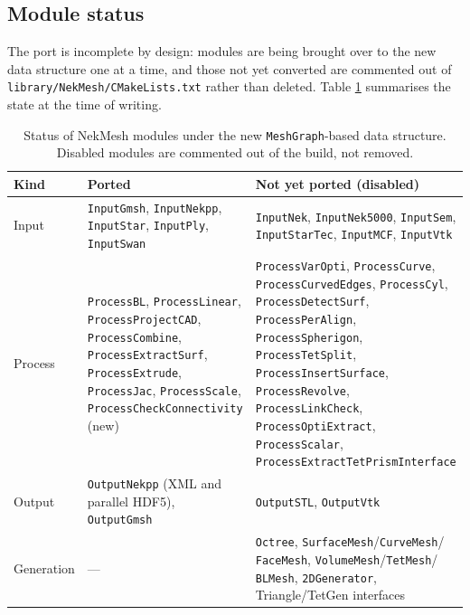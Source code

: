 \subsection{Module status}
The port is incomplete by design: modules are being brought over to
the new data structure one at a time, and those not yet converted are
commented out of \texttt{library/NekMesh/CMakeLists.txt} rather than
deleted. Table \ref{tab:module_status} summarises the state at the
time of writing.

\begin{table}[h!]
  \centering
  \begin{tabular}{p{}p{}p{}}
    \hline
    \textbf{Kind} & \textbf{Ported} & \textbf{Not yet ported (disabled)}\\
    \hline
    Input &
    \texttt{InputGmsh}, \texttt{InputNekpp}, \texttt{InputStar},
    \texttt{InputPly}, \texttt{InputSwan} &
    \texttt{InputNek}, \texttt{InputNek5000}, \texttt{InputSem},
    \texttt{InputStarTec}, \texttt{InputMCF}, \texttt{InputVtk}\\
    \hline
    Process &
    \texttt{ProcessBL}, \texttt{ProcessLinear},
    \texttt{ProcessProjectCAD}, \texttt{ProcessCombine},
    \texttt{ProcessExtractSurf}, \texttt{ProcessExtrude},
    \texttt{ProcessJac}, \texttt{ProcessScale},
    \texttt{ProcessCheckConnectivity} (new) &
    \texttt{ProcessVarOpti}, \texttt{ProcessCurve},
    \texttt{ProcessCurvedEdges}, \texttt{ProcessCyl},
    \texttt{ProcessDetectSurf}, \texttt{ProcessPerAlign},
    \texttt{ProcessSpherigon}, \texttt{ProcessTetSplit},
    \texttt{ProcessInsertSurface}, \texttt{ProcessRevolve},
    \texttt{ProcessLinkCheck}, \texttt{ProcessOptiExtract},
    \texttt{ProcessScalar},
    \texttt{ProcessExtractTetPrismInterface}\\
    \hline
    Output &
    \texttt{OutputNekpp} (XML and parallel HDF5),
    \texttt{OutputGmsh} &
    \texttt{OutputSTL}, \texttt{OutputVtk}\\
    \hline
    Generation & --- &
    \texttt{Octree}, \texttt{SurfaceMesh}/\texttt{CurveMesh}/%
    \texttt{FaceMesh}, \texttt{VolumeMesh}/\texttt{TetMesh}/%
    \texttt{BLMesh}, \texttt{2DGenerator}, Triangle/TetGen
    interfaces\\
    \hline
  \end{tabular}
  \caption{Status of NekMesh modules under the new
    \texttt{MeshGraph}-based data structure. Disabled modules are
    commented out of the build, not removed.}
  \label{tab:module_status}
\end{table}

